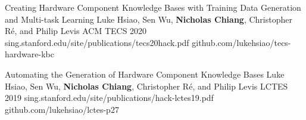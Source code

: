 



\begin{cvpubs}

  \cvpub
    {Creating Hardware Component Knowledge Bases with Training Data Generation and Multi-task Learning} %
    {Luke Hsiao, Sen Wu, \textbf{Nicholas Chiang}, Christopher Ré, and Philip Levis} %
    {ACM TECS} %
    {2020} %
    {sing.stanford.edu/site/publications/tecs20hack.pdf} %
    {github.com/lukehsiao/tecs-hardware-kbc} %

  \cvpub
    {Automating the Generation of Hardware Component Knowledge Bases} %
    {Luke Hsiao, Sen Wu, \textbf{Nicholas Chiang}, Christopher Ré, and Philip Levis} %
    {LCTES} %
    {2019} %
    {sing.stanford.edu/site/publications/hack-lctes19.pdf} %
    {github.com/lukehsiao/lctes-p27} %

\end{cvpubs}
